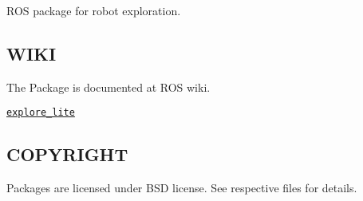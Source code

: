 \href{http://build.ros.org/job/Kdev__m_explore__ubuntu_xenial_amd64}{\tt }

R\+OS package for robot exploration.

\subsection*{W\+I\+KI }

The Package is documented at R\+OS wiki.
\begin{DoxyItemize}
\item \href{http://wiki.ros.org/explore_lite}{\tt explore\+\_\+lite}
\end{DoxyItemize}

\subsection*{C\+O\+P\+Y\+R\+I\+G\+HT }

Packages are licensed under B\+SD license. See respective files for details. 